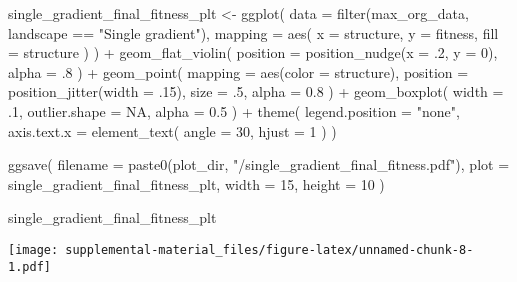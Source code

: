\documentclass[
]{book}
\newenvironment{Shaded}{\begin{snugshade}}{\end{snugshade}}
\newcommand{\AttributeTok}[1]{\textcolor[rgb]{0.77,0.63,0.00}{#1}}
\newcommand{\ConstantTok}[1]{\textcolor[rgb]{0.00,0.00,0.00}{#1}}
\newcommand{\DecValTok}[1]{\textcolor[rgb]{0.00,0.00,0.81}{#1}}
\newcommand{\FloatTok}[1]{\textcolor[rgb]{0.00,0.00,0.81}{#1}}
\newcommand{\FunctionTok}[1]{\textcolor[rgb]{0.00,0.00,0.00}{#1}}
\newcommand{\NormalTok}[1]{#1}
\newcommand{\OtherTok}[1]{\textcolor[rgb]{0.56,0.35,0.01}{#1}}
\newcommand{\SpecialCharTok}[1]{\textcolor[rgb]{0.00,0.00,0.00}{#1}}
\newcommand{\StringTok}[1]{\textcolor[rgb]{0.31,0.60,0.02}{#1}}
\begin{document}
\begin{Shaded}
\begin{Highlighting}[]
\NormalTok{single\_gradient\_final\_fitness\_plt }\OtherTok{\textless{}{-}} \FunctionTok{ggplot}\NormalTok{(}
    \AttributeTok{data =} \FunctionTok{filter}\NormalTok{(max\_org\_data, landscape }\SpecialCharTok{==} \StringTok{"Single gradient"}\NormalTok{),}
    \AttributeTok{mapping =} \FunctionTok{aes}\NormalTok{(}
      \AttributeTok{x =}\NormalTok{ structure,}
      \AttributeTok{y =}\NormalTok{ fitness,}
      \AttributeTok{fill =}\NormalTok{ structure}
\NormalTok{    )}
\NormalTok{  ) }\SpecialCharTok{+}
  \FunctionTok{geom\_flat\_violin}\NormalTok{(}
    \AttributeTok{position =} \FunctionTok{position\_nudge}\NormalTok{(}\AttributeTok{x =}\NormalTok{ .}\DecValTok{2}\NormalTok{, }\AttributeTok{y =} \DecValTok{0}\NormalTok{),}
    \AttributeTok{alpha =}\NormalTok{ .}\DecValTok{8}
\NormalTok{  ) }\SpecialCharTok{+}
  \FunctionTok{geom\_point}\NormalTok{(}
    \AttributeTok{mapping =} \FunctionTok{aes}\NormalTok{(}\AttributeTok{color =}\NormalTok{ structure),}
    \AttributeTok{position =} \FunctionTok{position\_jitter}\NormalTok{(}\AttributeTok{width =}\NormalTok{ .}\DecValTok{15}\NormalTok{),}
    \AttributeTok{size =}\NormalTok{ .}\DecValTok{5}\NormalTok{,}
    \AttributeTok{alpha =} \FloatTok{0.8}
\NormalTok{  ) }\SpecialCharTok{+}
  \FunctionTok{geom\_boxplot}\NormalTok{(}
    \AttributeTok{width =}\NormalTok{ .}\DecValTok{1}\NormalTok{,}
    \AttributeTok{outlier.shape =} \ConstantTok{NA}\NormalTok{,}
    \AttributeTok{alpha =} \FloatTok{0.5}
\NormalTok{  ) }\SpecialCharTok{+}
  \FunctionTok{theme}\NormalTok{(}
    \AttributeTok{legend.position =} \StringTok{"none"}\NormalTok{,}
    \AttributeTok{axis.text.x =} \FunctionTok{element\_text}\NormalTok{(}
      \AttributeTok{angle =} \DecValTok{30}\NormalTok{,}
      \AttributeTok{hjust =} \DecValTok{1}
\NormalTok{    )}
\NormalTok{  )}

\FunctionTok{ggsave}\NormalTok{(}
  \AttributeTok{filename =} \FunctionTok{paste0}\NormalTok{(plot\_dir, }\StringTok{"/single\_gradient\_final\_fitness.pdf"}\NormalTok{),}
  \AttributeTok{plot =}\NormalTok{ single\_gradient\_final\_fitness\_plt,}
  \AttributeTok{width =} \DecValTok{15}\NormalTok{,}
  \AttributeTok{height =} \DecValTok{10}
\NormalTok{)}

\NormalTok{single\_gradient\_final\_fitness\_plt}
\end{Highlighting}
\end{Shaded}

\texttt{[image: supplemental-material\_files/figure-latex/unnamed-chunk-8-1.pdf]}
\end{document}
